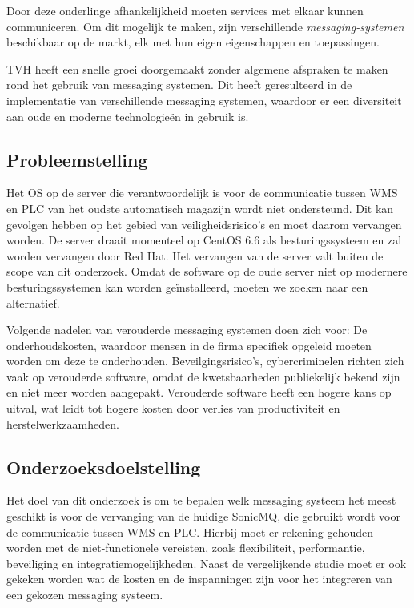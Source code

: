 Door deze onderlinge afhankelijkheid moeten services met elkaar kunnen communiceren. 
Om dit mogelijk te maken, zijn verschillende \emph{messaging-systemen} beschikbaar op de markt, 
elk met hun eigen eigenschappen en toepassingen.
\newline 

TVH heeft een snelle groei doorgemaakt zonder algemene afspraken te maken rond het gebruik van messaging systemen. 
Dit heeft geresulteerd in de implementatie van verschillende messaging systemen, waardoor er een diversiteit aan oude en moderne technologieën in gebruik is. 
\newline 
\newline
\newline

\subsection{Probleemstelling}
Het OS op de server die verantwoordelijk is voor de communicatie tussen WMS en PLC van het oudste automatisch magazijn wordt niet ondersteund.
Dit kan gevolgen hebben op het gebied van veiligheidsrisico's en moet daarom vervangen worden.
De server draait momenteel op CentOS 6.6 als besturingssysteem en zal worden vervangen door Red Hat.
Het vervangen van de server valt buiten de scope van dit onderzoek. 
Omdat de software op de oude server niet op modernere besturingssystemen kan worden geïnstalleerd, 
moeten we zoeken naar een alternatief.
\newline

Volgende nadelen van verouderde messaging systemen doen zich voor: 
De onderhoudskosten, waardoor mensen in de firma specifiek opgeleid moeten worden om deze te onderhouden. 
Beveilgingsrisico's, cybercriminelen richten zich vaak op verouderde software, omdat de kwetsbaarheden publiekelijk bekend zijn en niet meer worden aangepakt.
Verouderde software heeft een hogere kans op uitval, wat leidt tot hogere kosten door verlies van productiviteit en herstelwerkzaamheden.
\newline 

\subsection{Onderzoeksdoelstelling}
Het doel van dit onderzoek is om te bepalen welk messaging systeem het meest geschikt is voor de vervanging van de huidige SonicMQ,
die gebruikt wordt voor de communicatie tussen WMS en PLC. 
Hierbij moet er rekening gehouden worden met de niet-functionele vereisten,
zoals flexibiliteit, performantie, beveiliging en integratiemogelijkheden.
Naast de vergelijkende studie moet er ook gekeken worden wat de kosten en de inspanningen zijn 
voor het integreren van een gekozen messaging systeem. 
\newline 


